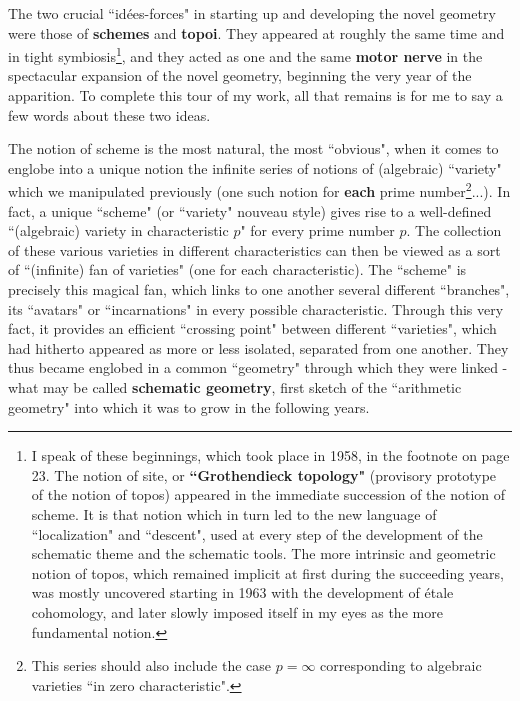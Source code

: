 The two crucial ``id\'ees-forces" in starting up and developing the novel geometry were those of \textbf{schemes} and \textbf{topoi}. They appeared at roughly the same time and in tight symbiosis\footnote{I speak of these beginnings, which took place in 1958, in the footnote on page 23. The notion of site, or \textbf{``Grothendieck topology"} (provisory prototype of the notion of topos) appeared in the immediate succession of the notion of scheme. It is that notion which in turn led to the new language of ``localization" and ``descent", used at every step of the development of the schematic theme and the schematic tools. The more intrinsic and geometric notion of topos, which remained implicit at first during the succeeding years, was mostly uncovered starting in 1963 with the development of \'etale cohomology, and later slowly imposed itself in my eyes as the more fundamental notion.}, and they acted as one and the same \textbf{motor nerve} in the spectacular expansion of the novel geometry, beginning the very year of the apparition. To complete this tour of my work, all that remains is for me to say a few words about these two ideas.

The notion of scheme is the most natural, the most ``obvious", when it comes to englobe into a unique notion the infinite series of notions of (algebraic) ``variety" which we manipulated previously (one such notion for \textbf{each} prime number\footnote{This series should also include the case $p = \infty$ corresponding to algebraic varieties ``in zero characteristic".}...). In fact, a unique ``scheme" (or ``variety" nouveau style) gives rise to a well-defined ``(algebraic) variety in characteristic $p$" for every prime number $p$. The collection of these various varieties in different characteristics can then be viewed as a sort of ``(infinite) fan of varieties" (one for each characteristic). The ``scheme" is precisely this magical fan, which links to one another several different ``branches", its ``avatars" or ``incarnations" in every possible characteristic. Through this very fact, it provides an efficient ``crossing point" between different ``varieties", which had hitherto appeared as more or less isolated, separated from one another. They thus became englobed in a common ``geometry" through which they were linked - what may be called \textbf{schematic geometry}, first sketch of the ``arithmetic geometry" into which it was to grow in the following years.

